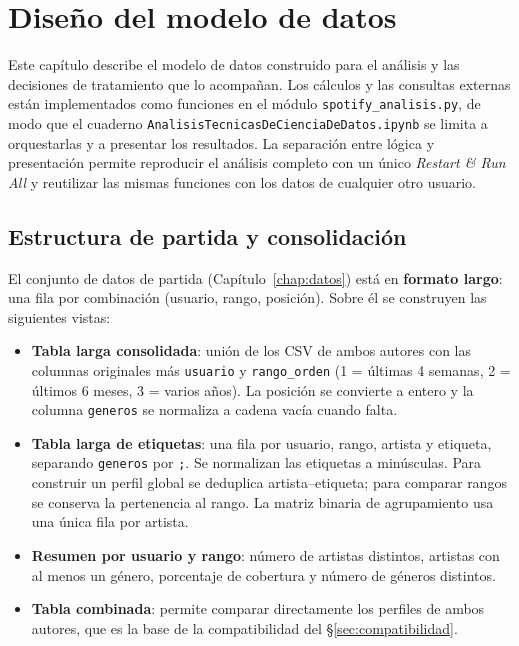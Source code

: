 
\chapter{Diseño del modelo de datos}
\label{chap:modelo}

Este capítulo describe el modelo de datos construido para el análisis y las decisiones de tratamiento que lo acompañan. Los cálculos y las consultas externas están implementados como funciones en el módulo \texttt{spotify\_analisis.py}, de modo que el cuaderno \texttt{AnalisisTecnicasDeCienciaDeDatos.ipynb} se limita a orquestarlas y a presentar los resultados. La separación entre lógica y presentación permite reproducir el análisis completo con un único \emph{Restart \& Run All} y reutilizar las mismas funciones con los datos de cualquier otro usuario.

\section{Estructura de partida y consolidación}
\label{sec:estructura-partida}

El conjunto de datos de partida (Capítulo~\ref{chap:datos}) está en \textbf{formato largo}: una fila por combinación (usuario, rango, posición). Sobre él se construyen las siguientes vistas:

\begin{itemize}
    \item \textbf{Tabla larga consolidada}: unión de los CSV de ambos autores con las columnas originales más \texttt{usuario} y \texttt{rango\_orden} (1 = últimas 4 semanas, 2 = últimos 6 meses, 3 = varios años). La posición se convierte a entero y la columna \texttt{generos} se normaliza a cadena vacía cuando falta.
    \item \textbf{Tabla larga de etiquetas}: una fila por usuario, rango, artista y etiqueta, separando \texttt{generos} por \texttt{;}. Se normalizan las etiquetas a minúsculas. Para construir un perfil global se deduplica artista--etiqueta; para comparar rangos se conserva la pertenencia al rango. La matriz binaria de agrupamiento usa una única fila por artista.
    \item \textbf{Resumen por usuario y rango}: número de artistas distintos, artistas con al menos un género, porcentaje de cobertura y número de géneros distintos.
    \item \textbf{Tabla combinada}: permite comparar directamente los perfiles de ambos autores, que es la base de la compatibilidad del \S\ref{sec:compatibilidad}.
\end{itemize}

